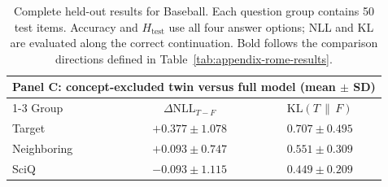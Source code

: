 \begin{table}[t]
  \vspace{1em}
  \begin{tabular}{lcc}
    \toprule
    \multicolumn{3}{l}{\textbf{Panel C: concept-excluded twin versus full model (mean $\pm$ SD)}} \\
    \cmidrule(lr){1-3}
    Group & $\Delta\mathrm{NLL}_{T-F}$ & $\mathrm{KL}(T\,\|\,F)$ \\
    \midrule
    Target      & $+0.377 \pm 1.078$ & $0.707 \pm 0.495$ \\
    Neighboring & $+0.093 \pm 0.747$ & $0.551 \pm 0.309$ \\
    SciQ        & $-0.093 \pm 1.115$ & $0.449 \pm 0.209$ \\
    \bottomrule
  \end{tabular}
  \caption{Complete held-out results for Baseball. Each question group
  contains 50 test items. Accuracy and $H_{\mathrm{test}}$ use all four answer
  options; NLL and KL are evaluated along the correct continuation. Bold
  follows the comparison directions defined in
  Table~\ref{tab:appendix-rome-results}.}
  \label{tab:appendix-baseball-results}
\end{table}

